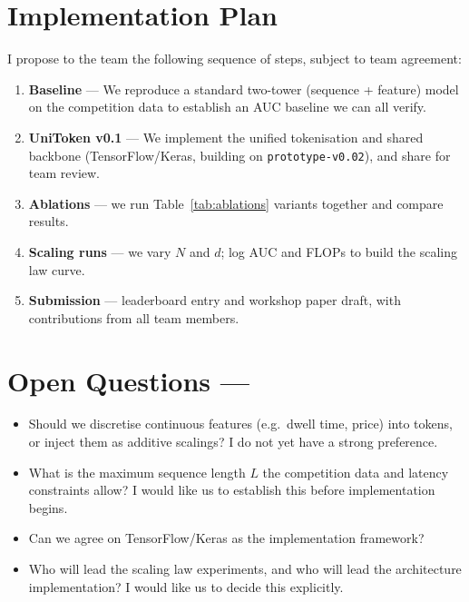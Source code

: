 \documentclass[10pt]{article}
\begin{document}
\section{Implementation Plan}

I propose to the team the following sequence of steps, subject to team agreement:

\begin{enumerate}[noitemsep]
    \item \textbf{Baseline} --- We reproduce a standard two-tower
          (sequence + feature) model on the competition data to establish
          an AUC baseline we can all verify.
    \item \textbf{UniToken v0.1} --- We  implement the unified
          tokenisation and shared backbone (TensorFlow/Keras, building on
          \texttt{prototype-v0.02}), and share for team review.
    \item \textbf{Ablations} --- we run Table~\ref{tab:ablations}
          variants together and compare results.
    \item \textbf{Scaling runs} --- we vary $N$ and $d$; log AUC and
          FLOPs to build the scaling law curve.
    \item \textbf{Submission} --- leaderboard entry and workshop paper
          draft, with contributions from all team members.
\end{enumerate}
\newpage
\section{Open Questions --- }

\begin{itemize}[noitemsep]
    \item Should we discretise continuous features (e.g.\ dwell time,
          price) into tokens, or inject them as additive scalings? I do
          not yet have a strong preference.
    \item What is the maximum sequence length $L$ the competition data
          and latency constraints allow? I would like us to establish
          this before implementation begins.
    \item Can we agree on TensorFlow/Keras as the implementation
          framework? 
    \item Who will lead the scaling law experiments, and who will lead
          the architecture implementation? I would like us to decide
          this explicitly.
\end{itemize}
\end{document}
